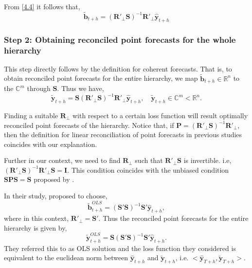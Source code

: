 \documentclass[a4paper, 11pt]{article}
\begin{document}
	From \eqref{4.4} it follows that,
	\begin{equation}
	\tilde{\bm{b}}_{t+h}=(\bm{R}'_\bot \bm{S})^{-1}\bm{R}'_\bot \hat{\bm{y}}_{t+h}
	\end{equation}
	
	\subsubsection*{Step 2: Obtaining reconciled point forecasts for the whole hierarchy}
	
	This step directly follows by the definition for coherent forecasts. That is, to obtain reconciled point forecasts for the entire hierarchy, we map $\tilde{\bm{b}}_{t+h} \in \bm{\mathbb{R}}^n$ to the $\bm{\mathbb{C}}^m$ through $\bm{S}$. Thus we have, 
	\begin{equation}
	\tilde{\bm{y}}_{t+h}=\bm{S}(\bm{R}'_\bot \bm{S})^{-1}\bm{R}'_\bot \hat{\bm{y}}_{t+h}, \quad \tilde{\bm{y}}_{t+h} \in \bm{\mathbb{C}}^m<\bm{\mathbb{R}}^n.
	\end{equation}
	
	Finding a suitable $\bm{R}_\bot$ with respect to a certain loss function will result optimally reconciled point forecasts of the hierarchy. Notice that, if $\bm{P}=(\bm{R}'_\bot \bm{S})^{-1}\bm{R}'_\bot$, then the definition for linear reconciliation of point forecasts in previous studies coincides with our explanation.
	
	Further in our context, we need to find $\bm{R}_\bot$ such that $\bm{R}'_\bot \bm{S}$ is invertible. i.e, $(\bm{R}'_\bot \bm{S})^{-1}\bm{R}'_\bot \bm{S}=\bm{I}$. This condition coincides with the unbiased condition $\bm{SPS}=\bm{S}$ proposed by \citet{Hyndman2011}.
	
	In their study, \citet{Hyndman2011} proposed to choose,
	\begin{equation*}
	\tilde{\bm{b}}^{OLS}_{t+h}=(\bm{S}' \bm{S})^{-1}\bm{S}' \hat{\bm{y}}_{t+h},
	\end{equation*}
	where in this context, $\bm{R}'_\bot = \bm{S}'$. Thus the reconciled point forecasts for the entire hierarchy is given by,
	\begin{equation}
	\tilde{\bm{y}}^{OLS}_{t+h}=\bm{S}(\bm{S}' \bm{S})^{-1}\bm{S}' \hat{\bm{y}}_{t+h}.
	\end{equation}
	They referred this to as OLS solution and the loss function they considered is equivalent to the euclidean norm between $\hat{\bm{y}}_{t+h}$ and $\tilde{\bm{y}}_{t+h}$, i.e. $<\hat{\bm{y}}_{T+h}, \tilde{\bm{y}}_{T+h}>$.
	
\end{document}
